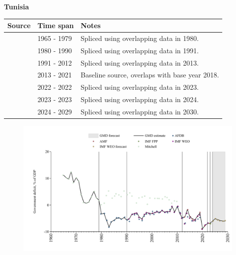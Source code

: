 \documentclass[12pt,a4paper,landscape]{article}
\begin{document}
\begin{adjustbox}{max totalsize={\paperwidth}{\paperheight},center}
\begin{minipage}[t][\textheight][t]{\textwidth}
\vspace*{0.5cm}
{}
\begin{center}
{\Large\bfseries Tunisia}
\end{center}
\vspace{0.5cm}
\begin{table}[H]
\centering
\small
\begin{tabular}{|l|l|l|}
\hline
\textbf{Source} & \textbf{Time span} & \textbf{Notes} \\
\hline
\rowcolor{white}\cite{Mitchell}& 1965 - 1979 &Spliced using overlapping data in 1980.\\
\rowcolor{lightgray}\cite{AFDB}& 1980 - 1990 &Spliced using overlapping data in 1991.\\
\rowcolor{white}\cite{IMF_WEO}& 1991 - 2012 &Spliced using overlapping data in 2013.\\
\rowcolor{lightgray}\cite{AMF}& 2013 - 2021 &Baseline source, overlaps with base year 2018.\\
\rowcolor{white}\cite{IMF_WEO}& 2022 - 2022 &Spliced using overlapping data in 2023.\\
\rowcolor{lightgray}\cite{IMF_FPP}& 2023 - 2023 &Spliced using overlapping data in 2024.\\
\rowcolor{white}\cite{IMF_WEO_forecast}& 2024 - 2029 &Spliced using overlapping data in 2030.\\
\hline
\end{tabular}
\end{table}
\begin{figure}[H]
\centering
\includegraphics[width=\textwidth,height=0.6\textheight,keepaspectratio]{graphs/TUN_govdef_GDP.pdf}
\end{figure}
\end{minipage}
\end{adjustbox}
\end{document}
